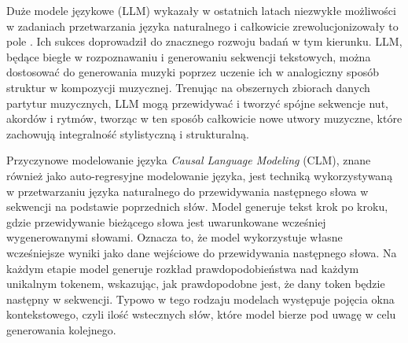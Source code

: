 \documentclass[data-science]{agh-wi} %
\begin{document}
Duże modele językowe (LLM) wykazały w ostatnich latach niezwykłe możliwości w zadaniach przetwarzania języka naturalnego i całkowicie zrewolucjonizowały to pole \cite{adiwardana2020humanlike, end_of_nlp}. Ich sukces doprowadził do znacznego rozwoju badań w tym kierunku. LLM, będące biegłe w rozpoznawaniu i generowaniu sekwencji tekstowych, można dostosować do generowania muzyki poprzez uczenie ich w analogiczny sposób struktur w kompozycji muzycznej. Trenując na obszernych zbiorach danych partytur muzycznych, LLM mogą przewidywać i tworzyć spójne sekwencje nut, akordów i rytmów, tworząc w ten sposób całkowicie nowe utwory muzyczne, które zachowują integralność stylistyczną i strukturalną.

Przyczynowe modelowanie języka \textit{Causal Language Modeling} (CLM), znane również jako auto-regresyjne modelowanie języka, jest techniką wykorzystywaną w przetwarzaniu języka naturalnego do przewidywania następnego słowa w sekwencji na podstawie poprzednich słów. Model generuje tekst krok po kroku, gdzie przewidywanie bieżącego słowa jest uwarunkowane wcześniej wygenerowanymi słowami. Oznacza to, że model wykorzystuje własne wcześniejsze wyniki jako dane wejściowe do przewidywania następnego słowa. Na każdym etapie model generuje rozkład prawdopodobieństwa nad każdym unikalnym tokenem, wskazując, jak prawdopodobne jest, że dany token będzie następny w sekwencji. Typowo w tego rodzaju modelach występuje pojęcia okna kontekstowego, czyli ilość wstecznych słów, które model bierze pod uwagę w celu generowania kolejnego.
\end{document}
